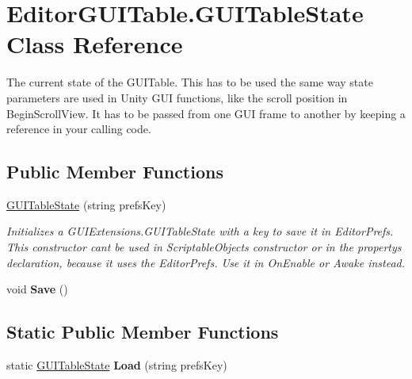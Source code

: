 \hypertarget{class_editor_g_u_i_table_1_1_g_u_i_table_state}{}\section{Editor\+G\+U\+I\+Table.\+G\+U\+I\+Table\+State Class Reference}
\label{class_editor_g_u_i_table_1_1_g_u_i_table_state}


The current state of the G\+U\+I\+Table. This has to be used the same way state parameters are used in Unity G\+UI functions, like the scroll position in Begin\+Scroll\+View. It has to be passed from one G\+UI frame to another by keeping a reference in your calling code.  


\subsection*{Public Member Functions}
\begin{DoxyCompactItemize}
\item 
\mbox{\hyperlink{class_editor_g_u_i_table_1_1_g_u_i_table_state_aab7e8f3314020a2f5fda74e6d618d330}{G\+U\+I\+Table\+State}} (string prefs\+Key)
\begin{DoxyCompactList}\small\item\em Initializes a G\+U\+I\+Extensions.\+G\+U\+I\+Table\+State with a key to save it in Editor\+Prefs. This constructor can\textquotesingle{}t be used in Scriptable\+Object\textquotesingle{}s constructor or in the property\textquotesingle{}s declaration, because it uses the Editor\+Prefs. Use it in On\+Enable or Awake instead. \end{DoxyCompactList}\item 
\mbox{\label{class_editor_g_u_i_table_1_1_g_u_i_table_state_a02acb0bb7c75ca1bcd97a2f89da2617b}} 
void {\bfseries Save} ()
\end{DoxyCompactItemize}
\subsection*{Static Public Member Functions}
\begin{DoxyCompactItemize}
\item 
\mbox{\label{class_editor_g_u_i_table_1_1_g_u_i_table_state_afe7dda29a996965d4b42b6861a148115}} 
static \mbox{\hyperlink{class_editor_g_u_i_table_1_1_g_u_i_table_state}{G\+U\+I\+Table\+State}} {\bfseries Load} (string prefs\+Key)
\end{DoxyCompactItemize}
